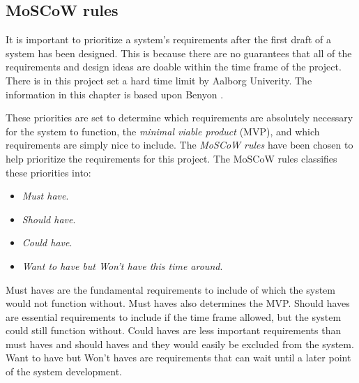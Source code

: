 \subsection{MoSCoW rules}\label{sec:requirements}

It is important to prioritize a system's requirements after the first draft of a system has been designed.
This is because there are no guarantees that all of the requirements and design ideas are doable within the time frame of the project.
There is in this project set a hard time limit by Aalborg Univerity.
The information in this chapter is based upon Benyon \cite{Benyon}.

These priorities are set to determine which requirements are absolutely necessary for the system to function, the \textit{minimal viable product} (MVP),
and which requirements are simply nice to include.
The \textit{MoSCoW rules}
have been chosen to help prioritize the requirements for this project.
The MoSCoW rules classifies these priorities into:

\begin{itemize}
    \item \textit{Must have}.
    \item \textit{Should have}.
    \item \textit{Could have}.
    \item \textit{Want to have but Won’t have this time around}.
\end{itemize}

Must haves are the fundamental requirements to include of which the system would not function without.
Must haves also determines the MVP.
Should haves are essential requirements to include if the time frame allowed, but the system could still function without.
Could haves are less important requirements than must haves and should haves and they would easily be excluded from the system.
Want to have but Won't haves are requirements that can wait until a later point of the system development.


